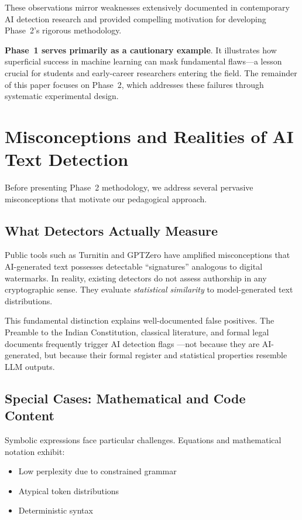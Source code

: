 \documentclass[conference]{IEEEtran}
\begin{document}
These observations mirror weaknesses extensively documented in contemporary AI detection research \cite{sadasivan2023can,krishna2023paraphrasing,liang2023gpt} and provided compelling motivation for developing Phase~2's rigorous methodology.

\textbf{Phase~1 serves primarily as a cautionary example}. It illustrates how superficial success in machine learning can mask fundamental flaws—a lesson crucial for students and early-career researchers entering the field. The remainder of this paper focuses on Phase~2, which addresses these failures through systematic experimental design.

\section{Misconceptions and Realities of AI Text Detection}

Before presenting Phase~2 methodology, we address several pervasive misconceptions that motivate our pedagogical approach.

\subsection{What Detectors Actually Measure}

Public tools such as Turnitin and GPTZero have amplified misconceptions that AI-generated text possesses detectable ``signatures'' analogous to digital watermarks. In reality, existing detectors do not assess authorship in any cryptographic sense. They evaluate \emph{statistical similarity} to model-generated text distributions.

This fundamental distinction explains well-documented false positives. The Preamble to the Indian Constitution, classical literature, and formal legal documents frequently trigger AI detection flags \cite{liang2023gpt}—not because they are AI-generated, but because their formal register and statistical properties resemble LLM outputs.

\subsection{Special Cases: Mathematical and Code Content}

Symbolic expressions face particular challenges. Equations and mathematical notation exhibit:
\begin{itemize}
    \item Low perplexity due to constrained grammar
    \item Atypical token distributions
    \item Deterministic syntax
\end{itemize}
\end{document}
